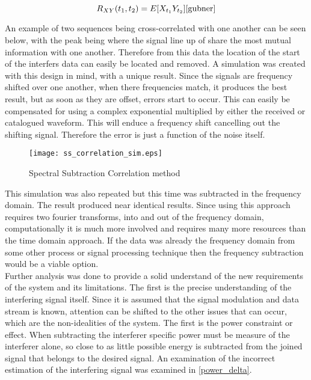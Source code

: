 \begin{equation}\label{cross}
R_{XY}(t_{1},t_{2})=E[X_{t_{1}}Y_{t_{2}}] \cite{gubner}
\end{equation}

An example of two sequences being cross-correlated with one another can be seen below, with the peak being where the signal line up of share the most mutual information with one another.  Therefore from this data the location of the start of the interfers data can easily be located and removed.  A simulation was created with this design in mind, with a unique result.  Since the signals are frequency shifted over one another, when there frequencies match, it produces the best result, but as soon as they are offset, errors start to occur.  This can easily be compensated for using a complex exponential multiplied by either the received or catalogued waveform.  This will enduce a frequency shift cancelling out the shifting signal.  Therefore the error is just a function of the noise itself.\\

\begin{figure}[!ht]\label{ss_correlation}
\centering
\texttt{[image: ss\_correlation\_sim.eps]}
\caption{Spectral Subtraction Correlation method}
\end{figure} 

This simulation was also repeated but this time was subtracted in the frequency domain.  The result produced near identical results.  Since using this approach requires two fourier transforms, into and out of the frequency domain, computationally it is much more involved and requires many more resources than the time domain approach.  If the data was already the frequency domain from some other process or signal processing technique then the frequency subtraction would be a viable option.\\

Further analysis was done to provide a solid understand of the new requirements of the system and its limitations.  The first is the precise understanding of the interfering signal itself.  Since it is assumed that the signal modulation and data stream is known, attention can be shifted to the other issues that can occur, which are the non-idealities of the system.  The first is the power constraint or effect.  When subtracting the interferer specific power must be measure of the interferer alone, so close to as little possible energy is subtracted from the joined signal that belongs to the desired signal.  An examination of the incorrect estimation of the interfering signal was examined in \ref{power_delta}.

